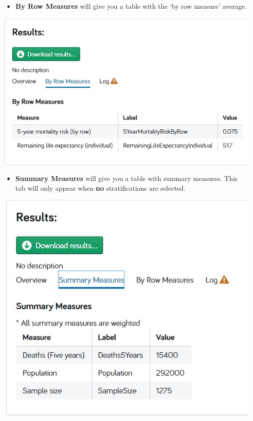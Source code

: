 \documentclass[]{book}
\providecommand{\tightlist}{%
  \setlength{\itemsep}{0pt}\setlength{\parskip}{0pt}}
\begin{document}
\begin{itemize}
\tightlist
\item
  \textbf{By Row Measures} will give you a table with the `by row
  measure' average.
\end{itemize}

\begin{center}\includegraphics{Images/Results-ByRow} \end{center}

\begin{itemize}
\tightlist
\item
  \textbf{Summary Measures} will give you a table with summary measures.
  This tab will only appear when \textbf{no} stratifications are
  selected.
\end{itemize}

\begin{center}\includegraphics{Images/Results-Summary} \end{center}
\end{document}
